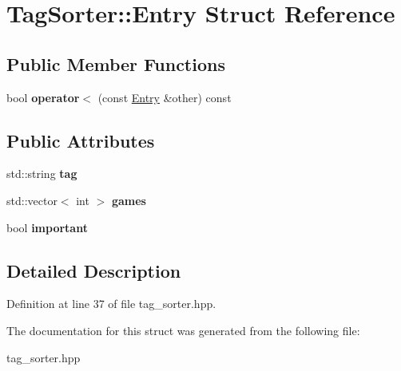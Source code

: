 \hypertarget{struct_tag_sorter_1_1_entry}{\section{Tag\-Sorter\-:\-:Entry Struct Reference}
\label{struct_tag_sorter_1_1_entry}
}
\subsection*{Public Member Functions}
\begin{DoxyCompactItemize}
\item 
\hypertarget{struct_tag_sorter_1_1_entry_a9d66aff1ff44d1c519c0c25382cc9085}{bool {\bfseries operator$<$} (const \hyperlink{struct_tag_sorter_1_1_entry}{Entry} \&other) const }\label{struct_tag_sorter_1_1_entry_a9d66aff1ff44d1c519c0c25382cc9085}

\end{DoxyCompactItemize}
\subsection*{Public Attributes}
\begin{DoxyCompactItemize}
\item 
\hypertarget{struct_tag_sorter_1_1_entry_aba6b22382c6f86c043c0e66affeb7c83}{std\-::string {\bfseries tag}}\label{struct_tag_sorter_1_1_entry_aba6b22382c6f86c043c0e66affeb7c83}

\item 
\hypertarget{struct_tag_sorter_1_1_entry_a83ddb24161db23f4fcf78414dec92209}{std\-::vector$<$ int $>$ {\bfseries games}}\label{struct_tag_sorter_1_1_entry_a83ddb24161db23f4fcf78414dec92209}

\item 
\hypertarget{struct_tag_sorter_1_1_entry_a8c8e3460c17533175c189862f70ab251}{bool {\bfseries important}}\label{struct_tag_sorter_1_1_entry_a8c8e3460c17533175c189862f70ab251}

\end{DoxyCompactItemize}


\subsection{Detailed Description}


Definition at line 37 of file tag\-\_\-sorter.\-hpp.



The documentation for this struct was generated from the following file\-:\begin{DoxyCompactItemize}
\item 
tag\-\_\-sorter.\-hpp\end{DoxyCompactItemize}
